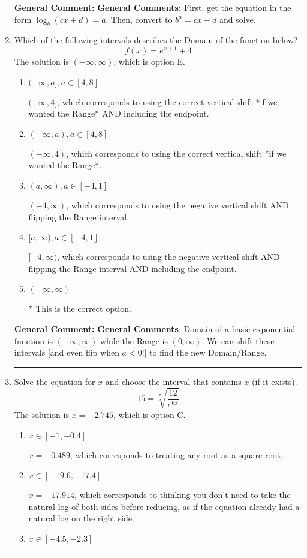\documentclass{extbook}[14pt]
\newcommand{\litem}[1]{\item #1

\rule{\textwidth}{0.4pt}}
\begin{document}
\begin{enumerate}
{\textbf{General Comment:} \textbf{General Comments:} First, get the equation in the form $\log_b{(cx+d)} = a$. Then, convert to $b^a = cx+d$ and solve.
}
\litem{
Which of the following intervals describes the Domain of the function below?
\[ f(x) = e^{x+1}+4 \]The solution is \( (-\infty, \infty) \), which is option E.\begin{enumerate}[label=\Alph*.]
\item \( (-\infty, a], a \in [4, 8] \)

$(-\infty, 4]$, which corresponds to using the correct vertical shift *if we wanted the Range* AND including the endpoint.
\item \( (-\infty, a), a \in [4, 8] \)

$(-\infty, 4)$, which corresponds to using the correct vertical shift *if we wanted the Range*.
\item \( (a, \infty), a \in [-4, 1] \)

$(-4, \infty)$, which corresponds to using the negative vertical shift AND flipping the Range interval.
\item \( [a, \infty), a \in [-4, 1] \)

$[-4, \infty)$, which corresponds to using the negative vertical shift AND flipping the Range interval AND including the endpoint.
\item \( (-\infty, \infty) \)

* This is the correct option.
\end{enumerate}

\textbf{General Comment:} \textbf{General Comments}: Domain of a basic exponential function is $(-\infty, \infty)$ while the Range is $(0, \infty)$. We can shift these intervals [and even flip when $a<0$!] to find the new Domain/Range.
}
\litem{
 Solve the equation for $x$ and choose the interval that contains $x$ (if it exists).
\[  15 = \sqrt[7]{\frac{12}{e^{6x}}} \]The solution is \( x = -2.745 \), which is option C.\begin{enumerate}[label=\Alph*.]
\item \( x \in [-1, -0.4] \)

$x = -0.489$, which corresponds to treating any root as a square root.
\item \( x \in [-19.6, -17.4] \)

$x = -17.914$, which corresponds to thinking you don't need to take the natural log of both sides before reducing, as if the equation already had a natural log on the right side.
\item \( x \in [-4.5, -2.3] \)


\end{enumerate}}
\end{enumerate}
\end{document}
